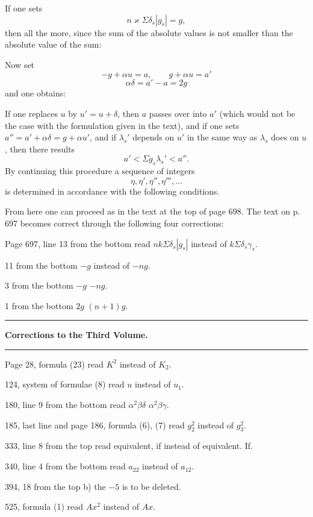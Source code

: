 If one sets
\[
n\varkappa\Sigma\delta_s|g_s| = g,
\]
then all the more, since the sum of the absolute values is not smaller than the absolute value of the sum:

Now set
\[
-g + \alpha u = a, \qquad g + \alpha u = a'
\]
\[
\alpha\delta = a' - a = 2g
\]
and one obtains:

If one replaces $u$ by $u' = u + \delta$, then $a$ passes over into $a'$ (which would not be the case with the formulation given in the text), and if one sets $a'' = a' + \alpha\delta = g + \alpha u'$, and if $\lambda_s'$ depends on $u'$ in the same way as $\lambda_s$ does on $u$, then there results
\[
a' < \Sigma g_s\lambda_s' < a''.
\]
By continuing this procedure a sequence of integers
\[
\eta, \eta', \eta'', \eta''', \ldots
\]
is determined in accordance with the following conditions.

From here one can proceed as in the text at the top of page 698. The text on p. 697 becomes correct through the following four corrections:

Page 697, line 13 from the bottom read $nk\Sigma\delta_s|g_s|$ instead of $k\Sigma\delta_s\gamma_s$.

\glqq{} 11 from the bottom \glqq{} $-g$ instead of $-ng$.

\glqq{} 3 from the bottom \glqq{} $-g$ \glqq{} $-ng$.

\glqq{} 1 from the bottom \glqq{} $2g$ \glqq{} $(n+1)g$.

\begin{center}
\rule{3cm}{0.4pt}
\end{center}

\begin{center}
\textbf{Corrections to the Third Volume.}
\end{center}

\begin{center}
\rule{3cm}{0.4pt}
\end{center}

Page 28, formula (23) read $K^2$ instead of $K_2$.

\glqq{} 124, system of formulae (8) read $u$ instead of $u_1$.

\glqq{} 180, line 9 from the bottom read $\alpha^2\beta\delta$ \glqq{} $\alpha^2\beta\gamma$.

\glqq{} 185, last line and page 186, formula (6), (7) read $g_2^2$ instead of $g_3^2$.

\glqq{} 333, line 8 from the top read equivalent, if instead of equivalent. If.

\glqq{} 340, line 4 from the bottom read $a_{22}$ instead of $a_{12}$.

\glqq{} 394, \glqq{} 18 from the top b) the $-5$ is to be deleted.

\glqq{} 525, formula (1) read $Ax^2$ instead of $Ax$.

\begin{center}
\makebox[3cm]{\dotfill}
\end{center}

